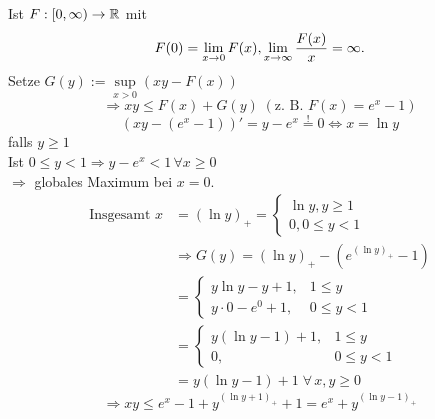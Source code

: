 \documentclass[../ana1.tex]{subfiles}
\begin{document}
\begin{bem}
    Ist \( F: [0,\infty) \rightarrow \mathbb{R} \) mit 
    \[ F(0) = \lim\limits_{x\rightarrow 0} F(x), 
    \lim\limits_{x\rightarrow\infty} \frac{F(x)}{x} = \infty. \]
    Setze \( G(y) := \underset{x>0}{\sup} (xy - F(x)) \)
    \[ \Rightarrow xy \leq F(x) + G(y) 
    \; (\text{z. B. } F(x) = e^x - 1) \]
    \[ (xy - (e^x - 1))' = y - e^x \overset{!}{=} 0 
    \Leftrightarrow x = \ln y \]
    falls \( y \geq 1 \) \\
    Ist \( 0 \leq y < 1 \Rightarrow y - e^x < 1 
    \, \forall x \geq 0 \) \\
    \( \Rightarrow \) globales Maximum bei \( x=0 \). \\
    \begin{align*}
        \text{Insgesamt } x &= (\ln y)_+ = \begin{cases}
            \ln y, y \geq 1 \\
            0, 0 \leq y < 1
        \end{cases} \\
        &\Rightarrow G(y) = ( \ln y )_+ - (e^{(\ln y)_+} - 1) \\
        &= \begin{cases}
            y \ln y - y + 1, &1 \leq y \\
            y \cdot 0 - e^0 + 1, &0 \leq y < 1
        \end{cases} \\
        &= \begin{cases}
            y (\ln y - 1) + 1, &1 \leq y \\
            0, &0 \leq y < 1
        \end{cases} \\
        &= y (\ln y - 1) + 1 \; \forall \, x,y \geq 0        
    \end{align*}
    \[ \Rightarrow xy \leq e^x - 1 + y^{(\ln y + 1)_+} + 1
    = e^x + y^{(\ln y - 1)_+} \]
\end{bem}
\end{document}
